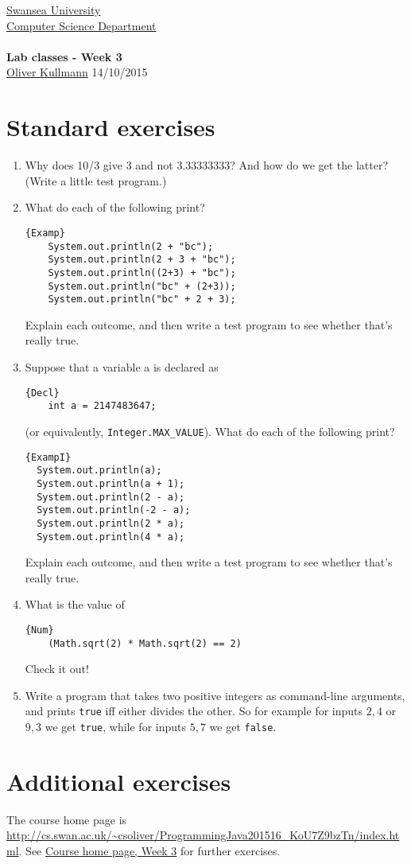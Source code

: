 \documentclass[11pt]{article}
\newcommand{\Java}{\lstset{language=Java,keywordstyle=\bfseries,breaklines,breakindent=30pt}}
\begin{document}
\begin{center}
  \href{http://www.swan.ac.uk/}{Swansea University}\\
  \href{http://www.swan.ac.uk/compsci/}{Computer Science Department}\\[1ex]
  \href{\chp}{\module}\\[1ex]
  \textbf{Lab classes - Week 3}\\
  \href{http://cs.swan.ac.uk/~csoliver}{Oliver Kullmann} 14/10/2015
\end{center}


\section{Standard exercises}
\label{sec:stdex}

\Java

\begin{enumerate}
\item Why does 10/3 give 3 and not 3.33333333? And how do we get the latter? (Write a little test program.)
\item What do each of the following print?
  \begin{lstlisting}{Examp}
    System.out.println(2 + "bc");
    System.out.println(2 + 3 + "bc");
    System.out.println((2+3) + "bc");
    System.out.println("bc" + (2+3));
    System.out.println("bc" + 2 + 3);
  \end{lstlisting}
  Explain each outcome, and then write a test program to see whether that's really true.
\item Suppose that a variable a is declared as
  \begin{lstlisting}{Decl}
    int a = 2147483647;
  \end{lstlisting}
  (or equivalently, \texttt{Integer.MAX\_VALUE}). What do each of the following print?
\begin{lstlisting}{ExampI}
  System.out.println(a);
  System.out.println(a + 1);
  System.out.println(2 - a);
  System.out.println(-2 - a);
  System.out.println(2 * a);
  System.out.println(4 * a);
  \end{lstlisting}
Explain each outcome, and then write a test program to see whether that's really true.
\item What is the value of
  \begin{lstlisting}{Num}
    (Math.sqrt(2) * Math.sqrt(2) == 2)
  \end{lstlisting}
  Check it out!
\item Write a program that takes two positive integers as command-line arguments, and prints \texttt{true} iff either divides the other. So for example for inputs $2,4$ or $9,3$ we get \texttt{true}, while for inputs $5,7$ we get \texttt{false}.
\end{enumerate}


\section{Additional exercises}
\label{sec:addex}

The course home page is \url{http://cs.swan.ac.uk/~csoliver/ProgrammingJava201516_KoU7Z9bzTn/index.html}. See \href{\chp#ExercisesWeek03}{Course home page, Week 3} for further exercises.
\end{document}
